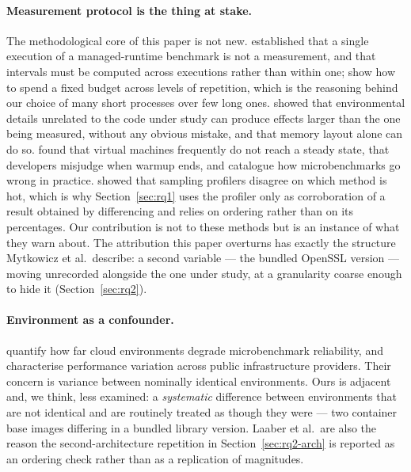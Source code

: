 \documentclass[pdflatex,sn-basic,twocolumn]{sn-jnl}%
\begin{document}
\paragraph{Measurement protocol is the thing at stake.} The methodological core
of this paper is not new. \citet{georges2007statistically}
established that a single execution of a managed-runtime benchmark is not a
measurement, and that intervals must be computed across executions rather than
within one; \citet{kalibera2013rigorous} show how to spend a
fixed budget across levels of repetition, which is the reasoning behind our
choice of many short processes over few long ones. \citet{mytkowicz2009wrong} showed that environmental details unrelated to
the code under study can produce effects larger than the one being measured,
without any obvious mistake, and \citet{curtsinger2013stabilizer} that memory layout alone can do so.
\citet{barrett2017warmup} found that virtual machines frequently
do not reach a steady state, \citet{traini2023steady} that
developers misjudge when warmup ends, and \citet{costa2021wrong}
catalogue how microbenchmarks go wrong in practice. \citet{mytkowicz2010profilers} showed that sampling profilers disagree on
which method is hot, which is why Section~\ref{sec:rq1} uses the profiler only
as corroboration of a result obtained by differencing and relies on ordering
rather than on its percentages. Our contribution is not to these methods but is
an instance of what they warn about. The attribution this paper overturns has
exactly the structure Mytkowicz et al.\ describe: a second variable --- the
bundled OpenSSL version --- moving unrecorded alongside the one under study, at
a granularity coarse enough to hide it (Section~\ref{sec:rq2}).

\paragraph{Environment as a confounder.} \citet{laaber2019cloud}
quantify how far cloud environments degrade microbenchmark reliability, and
\citet{leitner2016patterns} characterise performance variation
across public infrastructure providers. Their concern is variance between
nominally identical environments. Ours is adjacent and, we think, less
examined: a \emph{systematic} difference between environments that are not
identical and are routinely treated as though they were --- two container base
images differing in a bundled library version. Laaber et al.\ are also the
reason the second-architecture repetition in Section~\ref{sec:rq2-arch} is
reported as an ordering check rather than as a replication of magnitudes.
\end{document}
